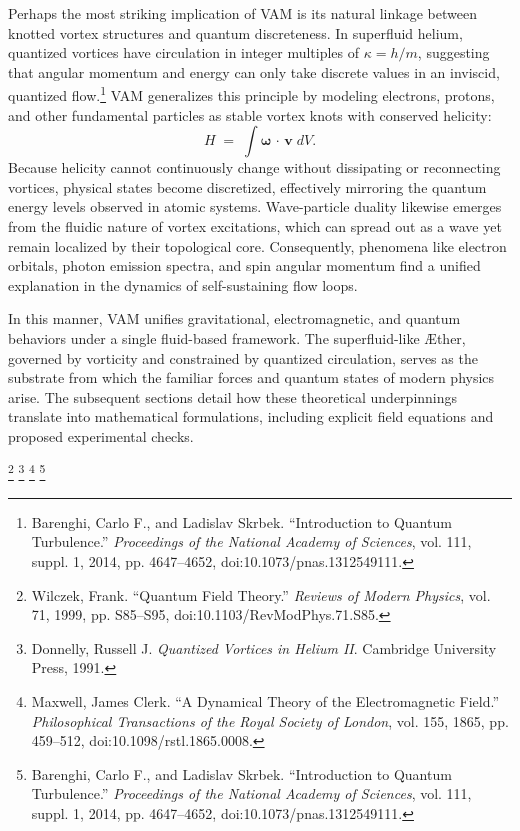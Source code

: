 Perhaps the most striking implication of VAM is its natural linkage between knotted vortex structures and quantum discreteness. In superfluid helium, quantized vortices have circulation in integer multiples of \(\kappa = h / m\), suggesting that angular momentum and energy can only take discrete values in an inviscid, quantized flow.\footnote{Barenghi, Carlo F., and Ladislav Skrbek. “Introduction to Quantum Turbulence.” \textit{Proceedings of the National Academy of Sciences}, vol. 111, suppl. 1, 2014, pp. 4647–4652, doi:10.1073/pnas.1312549111.} VAM generalizes this principle by modeling electrons, protons, and other fundamental particles as stable vortex knots with conserved helicity:
\[
    H \;=\; \int \boldsymbol{\omega} \,\cdot\, \mathbf{v}\; dV.
\]
Because helicity cannot continuously change without dissipating or reconnecting vortices, physical states become discretized, effectively mirroring the quantum energy levels observed in atomic systems. Wave-particle duality likewise emerges from the fluidic nature of vortex excitations, which can spread out as a wave yet remain localized by their topological core. Consequently, phenomena like electron orbitals, photon emission spectra, and spin angular momentum find a unified explanation in the dynamics of self-sustaining flow loops.

In this manner, VAM unifies gravitational, electromagnetic, and quantum behaviors under a single fluid-based framework. The superfluid-like Æther, governed by vorticity and constrained by quantized circulation, serves as the substrate from which the familiar forces and quantum states of modern physics arise. The subsequent sections detail how these theoretical underpinnings translate into mathematical formulations, including explicit field equations and proposed experimental checks.

\footnote{Wilczek, Frank. “Quantum Field Theory.” \textit{Reviews of Modern Physics}, vol. 71, 1999, pp. S85–S95, doi:10.1103/RevModPhys.71.S85.}
\footnote{Donnelly, Russell J. \textit{Quantized Vortices in Helium II}. Cambridge University Press, 1991.}
\footnote{Maxwell, James Clerk. “A Dynamical Theory of the Electromagnetic Field.” \textit{Philosophical Transactions of the Royal Society of London}, vol. 155, 1865, pp. 459–512, doi:10.1098/rstl.1865.0008.}
\footnote{Barenghi, Carlo F., and Ladislav Skrbek. “Introduction to Quantum Turbulence.” \textit{Proceedings of the National Academy of Sciences}, vol. 111, suppl. 1, 2014, pp. 4647–4652, doi:10.1073/pnas.1312549111.}
